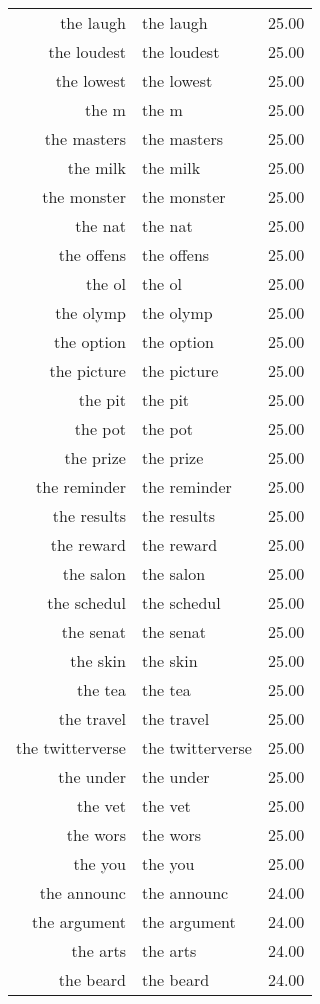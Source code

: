 \begin{table}[ht]
\begin{tabular}{rlr}
  the laugh & the laugh & 25.00 \\ 
  the loudest & the loudest & 25.00 \\ 
  the lowest & the lowest & 25.00 \\ 
  the m & the m & 25.00 \\ 
  the masters & the masters & 25.00 \\ 
  the milk & the milk & 25.00 \\ 
  the monster & the monster & 25.00 \\ 
  the nat & the nat & 25.00 \\ 
  the offens & the offens & 25.00 \\ 
  the ol & the ol & 25.00 \\ 
  the olymp & the olymp & 25.00 \\ 
  the option & the option & 25.00 \\ 
  the picture & the picture & 25.00 \\ 
  the pit & the pit & 25.00 \\ 
  the pot & the pot & 25.00 \\ 
  the prize & the prize & 25.00 \\ 
  the reminder & the reminder & 25.00 \\ 
  the results & the results & 25.00 \\ 
  the reward & the reward & 25.00 \\ 
  the salon & the salon & 25.00 \\ 
  the schedul & the schedul & 25.00 \\ 
  the senat & the senat & 25.00 \\ 
  the skin & the skin & 25.00 \\ 
  the tea & the tea & 25.00 \\ 
  the travel & the travel & 25.00 \\ 
  the twitterverse & the twitterverse & 25.00 \\ 
  the under & the under & 25.00 \\ 
  the vet & the vet & 25.00 \\ 
  the wors & the wors & 25.00 \\ 
  the you & the you & 25.00 \\ 
  the announc & the announc & 24.00 \\ 
  the argument & the argument & 24.00 \\ 
  the arts & the arts & 24.00 \\ 
  the beard & the beard & 24.00 \\ 

\end{tabular}
\end{table}
